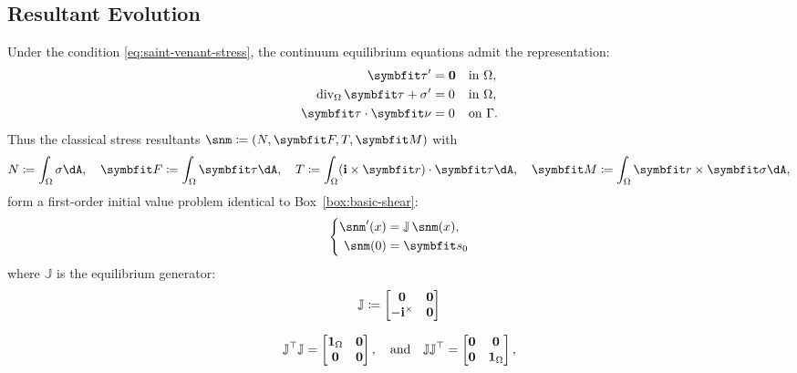 \subsection{Resultant Evolution}
Under the condition \eqref{eq:saint-venant-stress}, the continuum equilibrium equations admit the representation:
\begin{subequations}
\label{eq:sv-equilibrium}
\begin{align}
\bm{\tau}'&=\mathbf{0} && \text{in }\Section,\\
\DivS\bm{\tau}+\AxialStress'&=0 && \text{in }\Section, \label{eq:sv-axial-equilibrium}\\
\bm{\tau}\cdot\bm\nu&=0 && \text{on }\SectionBoundary.
\end{align}
\end{subequations}
Thus the classical stress resultants \(\snm \coloneq (N,\bm{F},T,\bm{M})\) with
\begin{equation}
N \coloneq \int_\Section \sigma \dA, \quad 
\bm{F} \coloneq \int_\Section \bm{\tau} \dA, \quad 
T \coloneq \int_\Section (\FrameBasis \times \bm{r}) \cdot \bm{\tau} \dA, \quad 
\bm{M} \coloneq \int_\Section \bm{r} \times \bm{\sigma} \dA,
\label{eq:resultant-defs}
\end{equation}
form a first-order initial value problem identical to Box~\ref{box:basic-shear}:
\begin{equation}
\left\{
\begin{aligned}
\snm'(x) & = \mathbb{J}\,\snm(x), \\
\snm(0) &= \bm{s}_0
\end{aligned}\right.
\label{eq:equilibrium-ode}
\end{equation}
where \(\mathbb{J}\) is the equilibrium generator:
\begin{equation}
\mathbb{J} \coloneq \begin{bmatrix}
 \mathbf{0} & \mathbf{0}\\
 -\mathbf{i}^\times & \mathbf{0}
\end{bmatrix}
\label{eq:J-matrix}
\end{equation}
\begin{Details}
\[
\mathbb{J}^{\top}\mathbb{J} = \begin{bmatrix}
    \mathbf{1}_\Omega & \mathbf{0} \\
    \mathbf{0} & \mathbf{0}
\end{bmatrix},
\quad\text{and}\quad 
\mathbb{J}\mathbb{J}^{\top} = \begin{bmatrix}
    \mathbf{0} & \mathbf{0} \\
    \mathbf{0} & \mathbf{1}_\Omega
\end{bmatrix},
\]
\end{Details}

